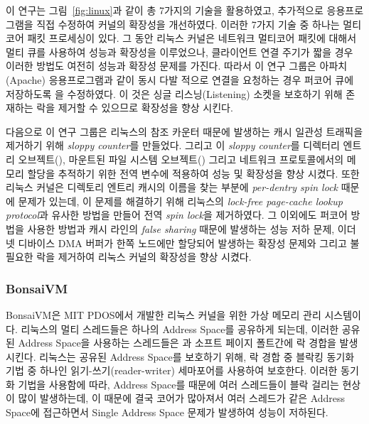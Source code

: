 이 연구는 그림~\ref{fig:linux}과 같이 총 7가지의 기술을 활용하였고, 추가적으로 응용프로그램을 직접 수정하여 
커널의 확장성을 개선하였다.
이러한 7가지 기술 중 하나는 멀티코어 패킷 프로세싱이 있다. 
그 동안 리눅스 커널은 네트워크 멀티코어 패킷에 대해서 멀티 큐를 사용하여 성능과 확장성을 이루었으나, 
클라이언트 연결 주기가 짧을 경우 이러한 방법도 여전히 성능과 확장성 문제를 가진다.
따라서 이 연구 그룹은 아파치(Apache) 응용프로그램과 같이 동시 다발 적으로 연결을 요청하는 경우 
퍼코어 큐에 저장하도록 을 수정하였다. 
이 것은 싱글 리스닝(Listening) 소켓을 보호하기 위해 존재하는 락을 제거할 수 있으므로 확장성을 향상 시킨다.

다음으로 이 연구 그룹은 리눅스의 참조 카운터 때문에 발생하는 캐시 일관성 트래픽을 제거하기 위해 
\textit{sloppy counter}를 만들었다.
그리고 이 \textit{sloppy counter}를 디렉터리 엔트리 오브젝트(), 마운트된 파일 시스템
오브젝트() 그리고 네트워크 프로토콜에서의 메모리 할당을 추적하기 위한 전역 변수에 
적용하여 성능 및 확장성을 향상 시켰다.
또한 리눅스 커널은 디렉토리 엔트리 캐시의 이름을 찾는 부분에 \textit{per-dentry spin lock} 때문에 문제가 
있는데, 이 문제를 해결하기 위해 리눅스의 \textit{lock-free page-cache lookup protocol}과
유사한 방법을 만들어 전역 \textit{spin lock}을 제거하였다.
그 이외에도 퍼코어 방법을 사용한 방법과 캐시 라인의 \textit{false sharing} 때문에 발생하는 성능 저하 문제, 
이더넷 디바이스 DMA 버퍼가 한쪽 노드에만 할당되어 발생하는 확장성 문제와 그리고 불필요한 락을 
제거하여 리눅스 커널의 확장성을 향상 시켰다.  

\subsubsection{BonsaiVM}
BonsaiVM은 MIT PDOS에서 개발한 리눅스 커널을 위한 가상 메모리 관리 시스템이다. 
리눅스의 멀티 스레드들은 하나의 Address Space를 공유하게 되는데, 이러한 공유된 Address Space을 사용하는 
스레드들은 과 소프트 페이지 폴트간에 락 경합을 발생 시킨다.
리눅스는 공유된 Address Space를 보호하기 위해, 락 경합 중 블락킹 동기화 기법 중 하나인
읽기-쓰기(reader-writer) 세마포어를 사용하여 보호한다.
이러한 동기화 기법을 사용함에 따라, Address Space를 때문에 여러 스레드들이 블락 걸리는 현상이 많이 발생하는데, 
이 때문에 결국 코어가 많아져서 여러 스레드가 같은 Address Space에 접근하면서 Single Address Space 문제가
발생하여 성능이 저하된다.

